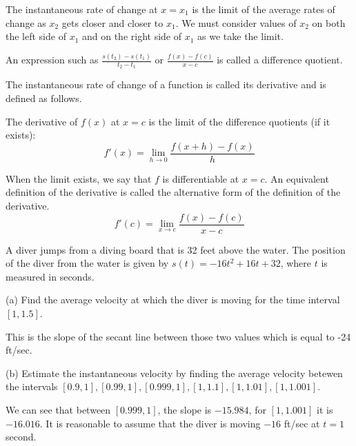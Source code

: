 \documentclass[../bccalc.tex]{subfiles}
\begin{document}
The instantaneous rate of change at $x=x_1$ is the limit of the average rates of change as $x_2$ gets closer and closer to $x_1$. We must consider values of $x_2$ on both the left side of $x_1$ and on the right side of $x_1$ as we take the limit.

An expression such as $\frac{s(t_2)-s(t_1)}{t_2-t_1}$ or $\frac{f(x)-f(c)}{x-c}$ is called a difference quotient.

The instantaneous rate of change of a function is called its derivative and is defined as follows.
\begin{definition}
    The derivative of $f(x)$ at $x=c$ is the limit of the difference quotients (if it exists):
    \[ f'(x)=\lim_{h\to 0}\frac{f(x+h)-f(x)}{h} \]
\end{definition}
When the limit exists, we say that $f$ is differentiable at $x=c$. An equivalent definition of the derivative is called the alternative form of the definition of the derivative.
\[ f'(c)=\lim_{x\to c}\frac{f(x)-f(c)}{x-c} \]

\begin{example}
    A diver jumps from a diving board that is 32 feet above the water. The position of the diver from the water is given by $s(t)=-16t^2+16t+32$, where $t$ is measured in seconds. 

    (a) Find the average velocity at which the diver is moving for the time interval $[1,1.5]$.

    This is the slope of the secant line between those two values which is equal to -24 ft/sec.

    (b) Estimate the instantaneous velocity by finding the average velocity betewen the intervals $[0.9,1], [0.99,1], [0.999,1], [1,1.1], [1,1.01], [1,1.001]$.

    We can see that between $[0.999,1]$, the slope is $-15.984$, for $[1,1.001]$ it is $-16.016$. It is reasonable to assume that the diver is moving $-16$ ft/sec at $t=1$ second.
\end{example}
\end{document}

